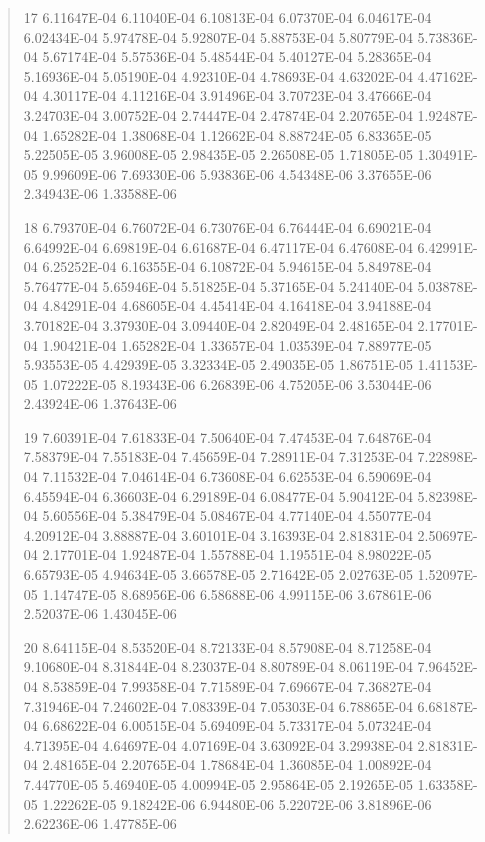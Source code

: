 \documentclass[letterpaper,10pt,english]{sphinxmanual}
\begin{document}
\begin{quote}
\begin{DUlineblock}{0em}
\item[] 17   6.11647E-04  6.11040E-04  6.10813E-04  6.07370E-04  6.04617E-04  6.02434E-04  5.97478E-04  5.92807E-04  5.88753E-04  5.80779E-04  5.73836E-04  5.67174E-04  5.57536E-04  5.48544E-04  5.40127E-04  5.28365E-04  5.16936E-04  5.05190E-04  4.92310E-04  4.78693E-04  4.63202E-04  4.47162E-04  4.30117E-04  4.11216E-04  3.91496E-04  3.70723E-04  3.47666E-04  3.24703E-04  3.00752E-04  2.74447E-04  2.47874E-04  2.20765E-04  1.92487E-04  1.65282E-04  1.38068E-04  1.12662E-04  8.88724E-05  6.83365E-05  5.22505E-05  3.96008E-05  2.98435E-05  2.26508E-05  1.71805E-05  1.30491E-05  9.99609E-06  7.69330E-06  5.93836E-06  4.54348E-06  3.37655E-06  2.34943E-06  1.33588E-06
\item[] 18   6.79370E-04  6.76072E-04  6.73076E-04  6.76444E-04  6.69021E-04  6.64992E-04  6.69819E-04  6.61687E-04  6.47117E-04  6.47608E-04  6.42991E-04  6.25252E-04  6.16355E-04  6.10872E-04  5.94615E-04  5.84978E-04  5.76477E-04  5.65946E-04  5.51825E-04  5.37165E-04  5.24140E-04  5.03878E-04  4.84291E-04  4.68605E-04  4.45414E-04  4.16418E-04  3.94188E-04  3.70182E-04  3.37930E-04  3.09440E-04  2.82049E-04  2.48165E-04  2.17701E-04  1.90421E-04  1.65282E-04  1.33657E-04  1.03539E-04  7.88977E-05  5.93553E-05  4.42939E-05  3.32334E-05  2.49035E-05  1.86751E-05  1.41153E-05  1.07222E-05  8.19343E-06  6.26839E-06  4.75205E-06  3.53044E-06  2.43924E-06  1.37643E-06
\item[] 19   7.60391E-04  7.61833E-04  7.50640E-04  7.47453E-04  7.64876E-04  7.58379E-04  7.55183E-04  7.45659E-04  7.28911E-04  7.31253E-04  7.22898E-04  7.11532E-04  7.04614E-04  6.73608E-04  6.62553E-04  6.59069E-04  6.45594E-04  6.36603E-04  6.29189E-04  6.08477E-04  5.90412E-04  5.82398E-04  5.60556E-04  5.38479E-04  5.08467E-04  4.77140E-04  4.55077E-04  4.20912E-04  3.88887E-04  3.60101E-04  3.16393E-04  2.81831E-04  2.50697E-04  2.17701E-04  1.92487E-04  1.55788E-04  1.19551E-04  8.98022E-05  6.65793E-05  4.94634E-05  3.66578E-05  2.71642E-05  2.02763E-05  1.52097E-05  1.14747E-05  8.68956E-06  6.58688E-06  4.99115E-06  3.67861E-06  2.52037E-06  1.43045E-06
\item[] 20   8.64115E-04  8.53520E-04  8.72133E-04  8.57908E-04  8.71258E-04  9.10680E-04  8.31844E-04  8.23037E-04  8.80789E-04  8.06119E-04  7.96452E-04  8.53859E-04  7.99358E-04  7.71589E-04  7.69667E-04  7.36827E-04  7.31946E-04  7.24602E-04  7.08339E-04  7.05303E-04  6.78865E-04  6.68187E-04  6.68622E-04  6.00515E-04  5.69409E-04  5.73317E-04  5.07324E-04  4.71395E-04  4.64697E-04  4.07169E-04  3.63092E-04  3.29938E-04  2.81831E-04  2.48165E-04  2.20765E-04  1.78684E-04  1.36085E-04  1.00892E-04  7.44770E-05  5.46940E-05  4.00994E-05  2.95864E-05  2.19265E-05  1.63358E-05  1.22262E-05  9.18242E-06  6.94480E-06  5.22072E-06  3.81896E-06  2.62236E-06  1.47785E-06

\end{DUlineblock}
\end{quote}
\end{document}
